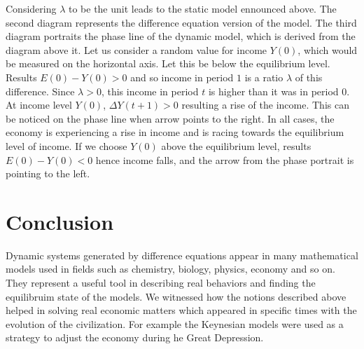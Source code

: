 \documentclass[a4paper,11pt]{report}
\begin{document}
Considering $\lambda$ to be the unit leads to the static model ennounced above. The second diagram represents the difference equation version of the model. The third diagram portraits the phase line of the dynamic model, which is derived from the diagram above it.
Let us consider a random value for income $Y(0)$, which would be measured on the horizontal axis. Let this be below the equilibrium level. Results $E(0)-Y(0)>0$ and so income in period $1$ is a ratio $\lambda$ of this difference. Since $\lambda>0$, this income in period $t$ is higher than it was in period $0$. At income level $Y(0)$, $\Delta Y(t+1)>0$ resulting a rise of the income. This can be noticed on the phase line when arrow points to the right. In all cases, the economy is experiencing a rise in income and is racing towards the equilibrium level of income. If we choose $Y(0)$ above the equilibrium level, results $E(0)-Y(0)<0$ hence income falls, and the arrow from the phase portrait is pointing to the left.



\section{Conclusion}
Dynamic systems generated by difference equations appear in many mathematical models used in fields such as chemistry, biology, physics, economy and so on. They represent a useful tool in describing real behaviors and finding the equilibruim state of the models.  We witnessed how the notions described above helped in solving real economic matters which appeared in specific times with the evolution of the civilization. For example the Keynesian models were used as a strategy to adjust the economy during he Great Depression.
\end{document}
